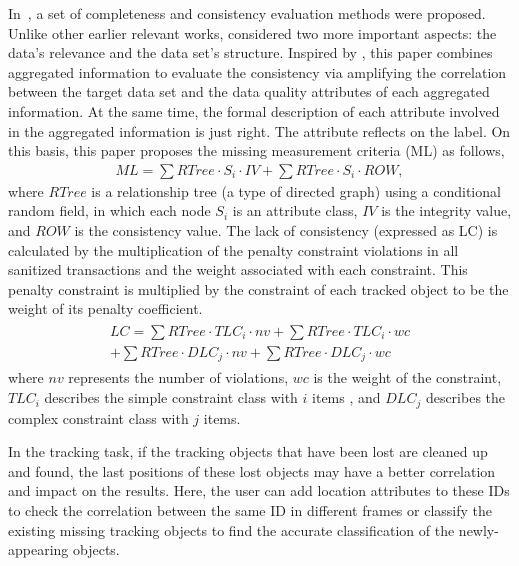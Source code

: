 \documentclass[trans]{IEEEtran}
\begin{document}
In~\cite{bertino2005information}, a set of completeness and consistency evaluation methods were proposed. Unlike other earlier relevant works, \cite{bertino2005information} considered two more important aspects: the data's relevance and the data set's structure. Inspired by \cite{bertino2005information}, this paper combines aggregated information to evaluate the consistency via amplifying the correlation between the target data set and the data quality attributes of each aggregated information. At the same time, the formal description of each attribute involved in the aggregated information is just right. The attribute reflects on the label. On this basis, this paper proposes the missing measurement criteria (ML) as follows,
\begin{eqnarray}\label{equ:CMLdet}
ML = \sum{RTree \cdot S_i\cdot IV} + \sum {RTree\cdot S_i\cdot ROW},
\end{eqnarray}
where $RTree$ is a relationship tree (a type of directed graph) using a conditional random field, in which each node $ {S_i} $ is an attribute class, $IV$ is the integrity value, and $ROW$ is the consistency value. The lack of consistency (expressed as LC) is calculated by the multiplication of the penalty constraint violations in all sanitized transactions and the weight associated with each constraint. This penalty constraint is multiplied by the constraint of each tracked object to be the weight of its penalty coefficient.
\begin{eqnarray}\label{equ:CSLdet}
\begin{aligned}
LC = \sum{RTree\cdot TLC_i \cdot nv} + \sum{RTree \cdot TLC_i \cdot wc} \\
+ \sum{RTree \cdot DLC_j \cdot nv} + \sum{RTree \cdot DLC_j \cdot wc}
\end{aligned}
\end{eqnarray}
where $nv$ represents the number of violations, $wc$ is the weight of the constraint, $ TLC_i $ describes the simple constraint class with $i$ items , and $ DLC_j $ describes the complex constraint class with $j$ items.

In the tracking task, if the tracking objects that have been lost are cleaned up and found, the last positions of these lost objects may have a better correlation and impact on the results. Here, the user can add location attributes to these IDs to check the correlation between the same ID in different frames or classify the existing missing tracking objects to find the accurate classification of the newly-appearing objects. 
\end{document}
